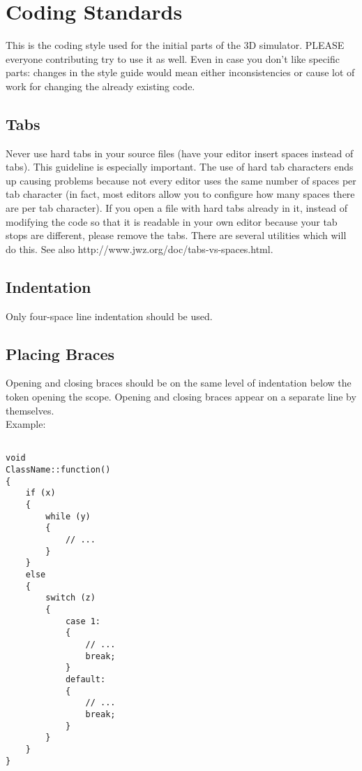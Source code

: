 \section{Coding Standards}

This is the coding style used for the initial parts of the 3D simulator. 
PLEASE everyone contributing try to use it as well. 
Even in case you don't like specific parts: changes in the style guide would mean 
either inconsistencies or cause lot of work for changing the already existing code. 

\subsection{Tabs}

Never use hard tabs in your source files (have your editor insert spaces instead of tabs). 
This guideline is especially important. The use of hard tab characters ends up causing 
problems because not every editor uses the same number of spaces per tab character 
(in fact, most editors allow you to configure how many spaces there are per tab character). 
If you open a file with hard tabs already in it, instead of modifying the code so that 
it is readable in your own editor because your tab stops are different, 
please remove the tabs. There are several utilities which will do this. 
See also http://www.jwz.org/doc/tabs-vs-spaces.html.

\subsection{Indentation}

Only four-space line indentation should be used. 

\subsection{Placing Braces}

Opening and closing braces should be on the same level of
indentation below the token opening the scope. Opening and closing
braces appear on a separate line by themselves.
\\

Example:
\begin{verbatim}

void
ClassName::function()
{
    if (x)
    {
        while (y)
        {
            // ...
        }
    }
    else
    {
        switch (z)
        {
            case 1:
            {
                // ...
                break;
            }
            default:
            {
                // ...
                break;
            }
        }
    }
}

\end{verbatim}

